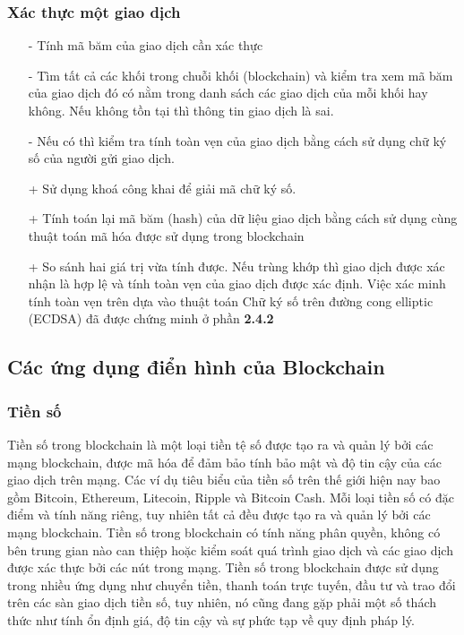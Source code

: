 \subsubsection{Xác thực một giao dịch}
\begin{itemize}
    \item[-] Tính mã băm của giao dịch cần xác thực
    \item[-] Tìm tất cả các khối trong chuỗi khối (blockchain) và kiểm tra xem mã băm của giao 
    dịch đó có nằm trong danh sách các giao dịch của mỗi khối hay không.
    Nếu không tồn tại thì thông tin giao dịch là sai.
    \item[-] Nếu có thì kiểm tra tính toàn vẹn của giao dịch bằng cách sử dụng chữ ký số 
    của người gửi giao dịch.
        \item[+] Sử dụng khoá công khai để giải mã chữ ký số.
        \item[+] Tính toán lại mã băm (hash) của dữ liệu giao dịch bằng cách sử dụng cùng
        thuật toán mã hóa được sử dụng trong blockchain 
        \item[+] So sánh hai giá trị vừa tính được. Nếu trùng khớp thì giao dịch được
        xác nhận là hợp lệ và tính toàn vẹn của giao dịch được xác định.
        Việc xác minh tính toàn vẹn trên dựa vào thuật toán Chữ ký số trên đường cong 
        elliptic (ECDSA) đã được chứng minh ở phần \textbf{2.4.2}
\end{itemize}

\subsection{Các ứng dụng điển hình của Blockchain}
\subsubsection{Tiền số}

Tiền số trong blockchain là một loại tiền tệ số được tạo ra và quản lý bởi các 
mạng blockchain, được mã hóa để đảm bảo tính bảo mật và độ tin cậy của các giao 
dịch trên mạng. Các ví dụ tiêu biểu của tiền số trên thế giới hiện nay bao gồm 
Bitcoin, Ethereum, Litecoin, Ripple và Bitcoin Cash. Mỗi loại tiền số có đặc điểm 
và tính năng riêng, tuy nhiên tất cả đều được tạo ra và quản lý bởi các mạng 
blockchain. Tiền số trong blockchain có tính năng phân quyền, không có bên trung 
gian nào can thiệp hoặc kiểm soát quá trình giao dịch và các giao dịch được xác 
thực bởi các nút trong mạng. Tiền số trong blockchain được sử dụng trong nhiều 
ứng dụng như chuyển tiền, thanh toán trực tuyến, đầu tư và trao đổi trên các sàn 
giao dịch tiền số, tuy nhiên, nó cũng đang gặp phải một số thách thức như tính 
ổn định giá, độ tin cậy và sự phức tạp về quy định pháp lý.

